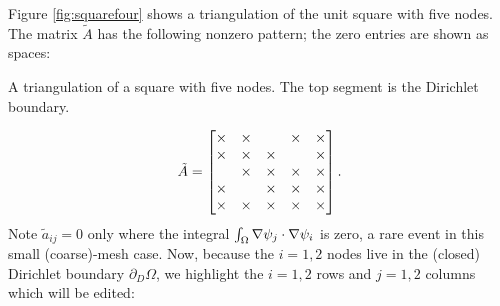 \medskip\noindent\hrulefill
\begin{example} Figure \ref{fig:squarefour} shows a triangulation of the unit square with five nodes.  The matrix $\tilde A$ has the following nonzero pattern; the zero entries are shown as spaces:\begin{marginfigure}

\caption{A triangulation of a square with five nodes.  The top segment is the Dirichlet boundary.}
\label{fig:squarefour}
\end{marginfigure}%
\begin{equation*}
\tilde A = \begin{bmatrix}
\times & \times &    & \times & \times \\
\times & \times & \times &    & \times \\
   & \times & \times & \times & \times \\
\times &    & \times & \times & \times \\
\times & \times & \times & \times & \times
\end{bmatrix}.
\end{equation*}
Note $\tilde a_{ij}=0$ only where the integral $\int_\Omega \nabla \psi_j \cdot \nabla \psi_i$ is zero, a rare event in this small (coarse)-mesh case.  Now, because the $i=1,2$ nodes live in the (closed) Dirichlet boundary $\partial_D \Omega$, we highlight the $i=1,2$ rows and $j=1,2$ columns which will be edited:

\newcommand{\redX}{{\color{red} \bm{\underline{\X}}}}
\newcommand{\blueX}{{\color{blue} \bm{\underline{\X}}}}


\end{example}
